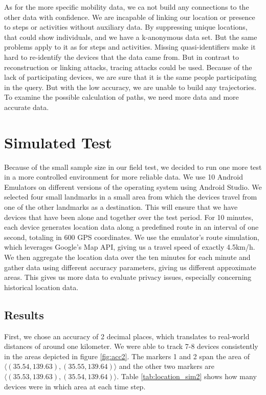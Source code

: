 As for the more specific mobility data, we ca not build any connections to the other data with confidence. We are incapable of linking our location or presence to steps or activities without auxiliary data. By suppressing unique locations, that could show individuals, and we have a k-anonymous data set. But the same problems apply to it as for steps and activities. Missing quasi-identifiers make it hard to re-identify the devices that the data came from. 
But in contrast to reconstruction or linking attacks, tracing attacks could be used. Because of the lack of participating devices, we are sure that it is the same people participating in the query. But with the low accuracy, we are unable to build any trajectories. To examine the possible calculation of paths, we need more data and more accurate data.

\section{Simulated Test}
Because of the small sample size in our field test, we decided to run one more test in a more controlled environment for more reliable data. We use 10 Android Emulators on different versions of the operating system using Android Studio. We selected four small landmarks in a small area from which the devices travel from one of the other landmarks as a destination. This will ensure that we have devices that have been alone and together over the test period. For 10 minutes, each device generates location data along a predefined route in an interval of one second, totaling in 600 GPS coordinates. We use the emulator's route simulation, which leverages Google's Map API, giving us a travel speed of exactly 4.5km/h. We then aggregate the location data over the ten minutes for each minute and gather data using different accuracy parameters, giving us different approximate areas. This gives us more data to evaluate privacy issues, especially concerning historical location data.

\subsection{Results}
First, we chose an accuracy of 2 decimal places, which translates to real-world distances of around one kilometer. We were able to track 7-8 devices consistently in the areas depicted in figure \ref{fig:acc2}. The markers 1 and 2 span the area of \(\langle(35.54, 139.63),(35.55, 139.64)\rangle\) and the other two markers are \(\langle(35.53, 139.63),(35.54, 139.64)\rangle\). Table \ref{tab:location_sim2} shows how many devices were in which area at each time step. 


